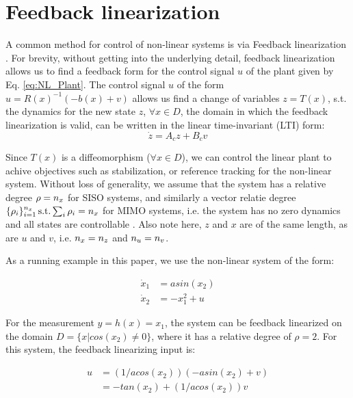\section{Feedback linearization}
\label{sec:feedbacklin}
A common method for control of non-linear systems is via Feedback linearization \cite{khalil}. For brevity, without getting into the underlying detail, feedback linearization allows us to find a feedback form for the control signal $u$ of the plant given by Eq. \ref{eq:NL_Plant}. The control signal $u$ of the form $u = R(x)^{-1}(-b(x)+v)$ allows us find a change of variables $z=T(x)$, s.t. the dynamics for the new state $z$, $\forall x \in D$, the domain in which the feedback linearization is valid, can be written in the linear time-invariant (LTI) form:
\begin{equation}
\label{eq:LTI_fb_lin}
\dot{z} = A_cz + B_cv
\end{equation}

Since $T(x)$ is a diffeomorphism ($\forall x \in D$), we can control the linear plant to achive objectives such as stabilization, or reference tracking for the non-linear system. Without loss of generality, we assume that the system has a relative degree $\rho=n_x$ for SISO systems, and similarly a vector relatie degree $\lbrace \rho_i \rbrace_{i=1}^{n_x}\, \text{s.t.} \sum_i \rho_i = n_x$ for MIMO systems, i.e. the system has no zero dynamics and all states are controllable \cite{khalil}. Also note here, $z$ and $x$ are of the same length, as are $u$ and $v$, i.e. $n_x = n_z$ and $n_u = n_v$.


 As a running example in this paper, we use the non-linear system of the form:

\begin{subequations}
\begin{align}
\dot{x}_1 &= asin(x_2) \\
\dot{x}_2 &=-x_1^2 + u 
\end{align}
\end{subequations}

For the measurement $y = h(x) = x_1$, the system can be feedback linearized on the domain $D = \lbrace x | cos(x_2) \neq 0 \rbrace $, where it has a relative degree of $\rho=2$. For this system, the feedback linearizing input is:

\begin{subequations}
\begin{align}
u &= (1/acos(x_2))(-asin(x_2)+v) \nonumber \\
&= -tan(x_2) + (1/acos(x_2))v
\end{align}
\end{subequations}

